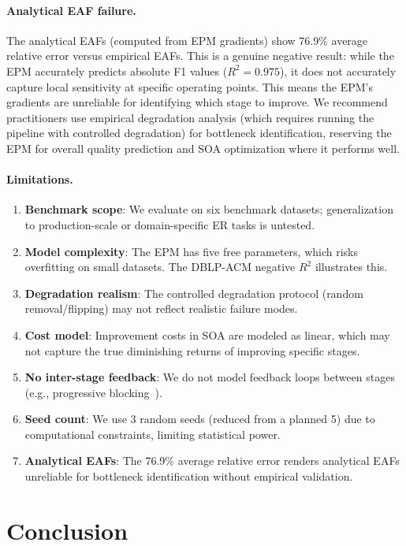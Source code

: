 \documentclass{article}
\begin{document}
\paragraph{Analytical EAF failure.}
The analytical EAFs (computed from EPM gradients) show 76.9\% average relative error versus empirical EAFs. This is a genuine negative result: while the EPM accurately predicts absolute F1 values ($R^2 = 0.975$), it does not accurately capture local sensitivity at specific operating points. This means the EPM's gradients are unreliable for identifying which stage to improve. We recommend practitioners use empirical degradation analysis (which requires running the pipeline with controlled degradation) for bottleneck identification, reserving the EPM for overall quality prediction and SOA optimization where it performs well.

\paragraph{Limitations.}
\begin{enumerate}
    \item \textbf{Benchmark scope}: We evaluate on six benchmark datasets; generalization to production-scale or domain-specific ER tasks is untested.
    \item \textbf{Model complexity}: The EPM has five free parameters, which risks overfitting on small datasets. The DBLP-ACM negative $R^2$ illustrates this.
    \item \textbf{Degradation realism}: The controlled degradation protocol (random removal/flipping) may not reflect realistic failure modes.
    \item \textbf{Cost model}: Improvement costs in SOA are modeled as linear, which may not capture the true diminishing returns of improving specific stages.
    \item \textbf{No inter-stage feedback}: We do not model feedback loops between stages (e.g., progressive blocking~\citep{galhotra2021efficient}).
    \item \textbf{Seed count}: We use 3 random seeds (reduced from a planned 5) due to computational constraints, limiting statistical power.
    \item \textbf{Analytical EAFs}: The 76.9\% average relative error renders analytical EAFs unreliable for bottleneck identification without empirical validation.
\end{enumerate}

\section{Conclusion}
\label{sec:conclusion}
\end{document}
